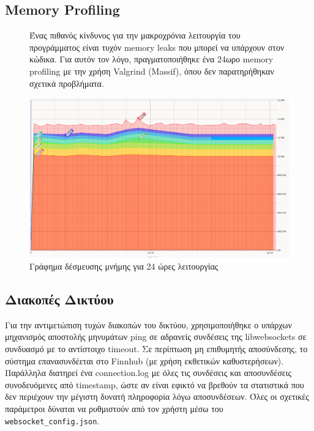 \documentclass[12pt]{article}
\begin{document}
\subsection{Memory Profiling}
\begin{figure}[H]
    \centering
    \begin{minipage}{0.45\textwidth}
        Ένας πιθανός κίνδυνος για την μακροχρόνια λειτουργία του προγράμματος είναι τυχόν memory leaks που μπορεί να υπάρχουν στον κώδικα. 
        Για αυτόν τον λόγο, πραγματοποιήθηκε ένα 24ωρο memory profiling με την χρήση Valgrind (Massif), όπου δεν παρατηρήθηκαν σχετικά προβλήματα.
    \end{minipage}
    \hfill
    \begin{minipage}{0.45\textwidth}
        \centering
        \includegraphics[width=\linewidth]{massif.png} %
        \caption{Γράφημα δέσμευσης μνήμης για 24 ώρες λειτουργίας}
        \label{fig:massif}
    \end{minipage}
\end{figure}


\subsection{Διακοπές Δικτύου}
Για την αντιμετώπιση τυχών διακοπών του δικτύου, χρησιμοποιήθηκε ο υπάρχων μηχανισμός αποστολής μηνυμάτων ping σε αδρανείς συνδέσεις της libwebsockets σε συνδυασμό με το αντίστοιχο timeout. Σε περίπτωση μη επιθυμητής αποσύνδεσης, το σύστημα επανασυνδέεται στο Finnhub (με χρήση εκθετικών καθυστερήσεων). Παράλληλα διατηρεί ένα connection.log με όλες τις συνδέσεις και αποσυνδέσεις συνοδευόμενες από timestamp, ώστε αν είναι εφικτό να βρεθούν τα στατιστικά που δεν περιέχουν την μέγιστη δυνατή πληροφορία λόγω αποσυνδέσεων. Όλες οι σχετικές παράμετροι δύναται να ρυθμιστούν από τον χρήστη μέσω του \texttt{websocket\_config.json}.
\end{document}
